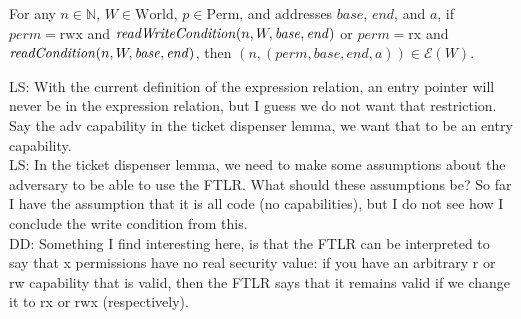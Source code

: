 \documentclass{article}
\newcommand{\forcenewline}{$\phantom{v}$\\}
\newcommand\lau[1]{{\color{purple} \sf \footnotesize {LS: #1}}\\}
\newcommand\dominique[1]{{\color{purple} \sf \footnotesize {DD: #1}}\\}
\newcommand{\var}[1]{\mathit{#1}}
\newcommand{\perm}{\var{perm}}
\newcommand{\plainfun}[2]{
  \ifthenelse{\equal{#2}{}}
             {\mathit{#1}}
             {\mathit{#1}(#2)}
}
\newcommand{\readCond}[1]{\plainfun{readCondition}{#1}}
\newcommand{\writeCond}[1]{\plainfun{readWriteCondition}{#1}}
\newcommand{\asmType}{\plaindom{AsmType}}
\newcommand{\plaindom}[1]{\mathrm{#1}}
\newcommand{\nats}{\mathbb{N}}
\newcommand{\Perms}{\plaindom{Perm}}
\newcommand{\Worlds}{\plaindom{World}}
\newcommand{\intr}[2]{\mathcal{#1}}
\newcommand{\exprintr}[1]{\intr{E}{#1}}
\newcommand{\stder}{\exprintr{\asmType}}
\newcommand{\npair}[2][n]{\left(#1,#2 \right)}
\newcommand{\plainperm}[1]{\mathrm{#1}}
\newcommand{\exec}{\plainperm{rx}}
\newcommand{\rwx}{\plainperm{rwx}}
\begin{document}
\begin{lemma} \forcenewline
  For any $n \in \nats$, $W \in \Worlds$, $p\in \Perms$, and addresses $\var{base}$, $\var{end}$, and $a$, if $\perm = \rwx$ and $\writeCond{n,W,\var{base},\var{end}}$ or $\perm = \exec$ and $\readCond{n,W,\var{base},\var{end}}$, then $\npair{(\perm, \var{base}, \var{end}, a)} \in \stder(W)$.
\end{lemma} %
\lau{With the current definition of the expression relation, an entry pointer will never be in the expression relation, but I guess we do not want that restriction. Say the adv capability in the ticket dispenser lemma, we want that to be an entry capability.}
\lau{In the ticket dispenser lemma, we need to make some assumptions about the adversary to be able to use the FTLR. What should these assumptions be? So far I have the assumption that it is all code (no capabilities), but I do not see how I conclude the write condition from this.}
\dominique{Something I find interesting here, is that the FTLR can be interpreted to say that x permissions have no real security value: if you have an arbitrary r or rw capability that is valid, then the FTLR says that it remains valid if we change it to rx or rwx (respectively).}
\end{document}

